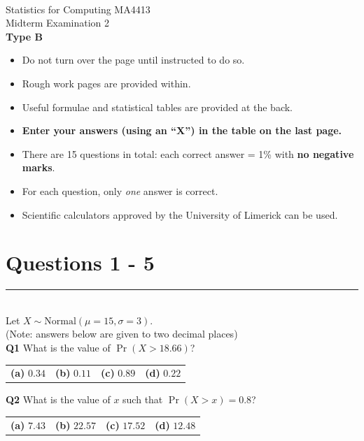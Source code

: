 \documentclass[12pt]{article}
\begin{document}
\quad\\[2cm]

\begin{center}
{\Huge Statistics for Computing MA4413\\[0.8cm]
Midterm Examination 2\\[1cm]
{\bf Type B}}\\[2cm]
\end{center}

\begin{itemize}\itemsep0.6cm
\item Do not turn over the page until instructed to do so.
\item Rough work pages are provided within.
\item Useful formulae and statistical tables are provided at the back.
\item {\bf Enter your answers (using an ``X'') in the table on the last page.}
\item There are 15 questions in total: each correct answer = 1\% with {\bf no negative marks}.
\item For each question, only \emph{one} answer is correct.
\item Scientific calculators approved by the University of Limerick can be used.
\end{itemize}

\newpage
\section*{Questions 1 - 5}


\rule{\linewidth}{1pt}
\quad\\
Let $X \sim \text{Normal}(\mu=15,\sigma=3)$.\\{\footnotesize(Note: answers below are given to two decimal places)}\\[0.2cm]

{\bf Q1} What is the value of $\Pr(X > 18.66)$?\\[0.2cm]
\begin{tabular}{cccc}
{\bf(a)} $0.34$ & {\bf(b)} $0.11$ & {\bf(c)} $0.89$  & {\bf(d)} $0.22$ \\[0.6cm]
\end{tabular}


{\bf Q2} What is the value of $x$ such that $\Pr(X > x) = 0.8$?\\[0.2cm]
\begin{tabular}{cccc}
{\bf(a)} $7.43$  & {\bf(b)} $22.57$ & {\bf(c)} $17.52$ & {\bf(d)} $12.48$   \\[0.6cm]
\end{tabular}
\end{document}
